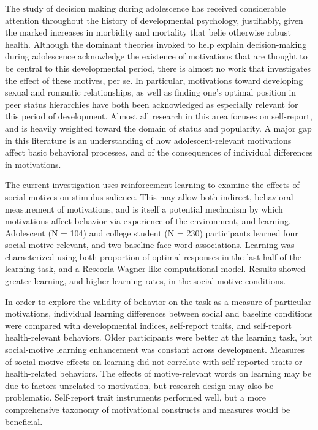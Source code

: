 The study of decision making during adolescence has received considerable attention throughout the history of developmental psychology, justifiably, given the marked increases in morbidity and mortality that belie otherwise robust health.
Although the dominant theories invoked to help explain decision-making during adolescence acknowledge the existence of motivations that are thought to be central to this developmental period, there is almost no work that investigates the effect of these motives, per se.
In particular, motivations toward developing sexual and romantic relationships, as well as finding one's optimal position in peer status hierarchies have both been acknowledged as especially relevant for this period of development.
Almost all research in this area focuses on self-report, and is heavily weighted toward the domain of status and popularity.
A major gap in this literature is an understanding of how adolescent-relevant motivations affect basic behavioral processes, and of the consequences of individual differences in motivations.

The current investigation uses reinforcement learning to examine the effects of social motives on stimulus salience. 
This may allow both indirect, behavioral measurement of motivations, and is itself a potential mechanism by which motivations affect behavior via experience of the environment, and learning.
Adolescent (N = 104) and college student (N = 230) participants learned four social-motive-relevant, and two baseline face-word associations.
Learning was characterized using both proportion of optimal responses in the last half of the learning task, and a Rescorla-Wagner-like computational model.
Results showed greater learning, and higher learning rates, in the social-motive conditions.

In order to explore the validity of behavior on the task as a measure of particular motivations, individual learning differences  between social and baseline conditions were compared with developmental indices, self-report traits, and self-report health-relevant behaviors.
Older participants were better at the learning task, but social-motive learning enhancement was constant across development.
Measures of social-motive effects on learning did not correlate with self-reported traits or health-related behaviors.
The effects of motive-relevant words on learning may be due to factors unrelated to motivation, but research design may also be problematic.
Self-report trait instruments performed well, but a more comprehensive taxonomy of motivational constructs and measures would be beneficial.
